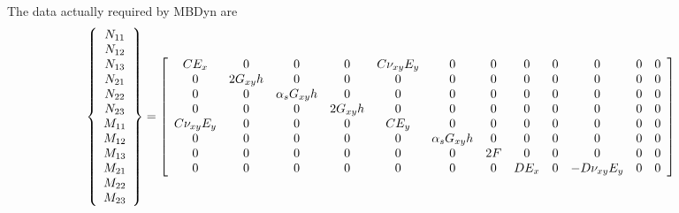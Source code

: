 The data actually required by MBDyn are
{\tiny
\begin{align}
        \cubr{\cvvect{
                N_{11}
                \\
                N_{12}
                \\
                N_{13}
                \\
                N_{21}
                \\
                N_{22}
                \\
                N_{23}
                \\
                M_{11}
                \\
                M_{12}
                \\
                M_{13}
		\\
                M_{21}
                \\
                M_{22}
                \\
                M_{23}
        }}
        &=
        \sqbr{\matr{cccccccccccc}{
  CE_{x} & 0      & 0      & 0 & C\nu_{xy}E_y & 0     & 0 & 0 & 0 & 0 & 0 & 0
  \\                                                                                
  0      & 2G_{xy}h  & 0   & 0 & 0  & 0               & 0 & 0 & 0 & 0 & 0 & 0
  \\                                                                             
  0      & 0      & \alpha_sG_{xy}h      & 0      & 0      & 0      & 0 & 0 & 0 & 0 & 0 & 0
  \\                                                                             
  0      & 0 & 0      & 2G_{xy}h & 0 & 0      & 0 & 0 & 0 & 0 & 0 & 0
  \\                                                                             
  C\nu_{xy}E_y & 0 & 0      & 0 & CE_{y} & 0      & 0 & 0 & 0 & 0 & 0 & 0
  \\                                                                             
  0      & 0      & 0      & 0      & 0      & \alpha_sG_{xy}h      & 0 & 0 & 0 & 0 & 0 & 0
  \\                                                                                                      
  0 & 0 & 0 & 0 & 0 & 0      & 2F & 0 & 0    & 0 & 0 & 0
  \\                                                                                                 
  0 & 0 & 0 & 0 & 0 & 0      & 0 & DE_x & 0    & -D\nu_{xy}E_y & 0 & 0
}}
\end{align}}
